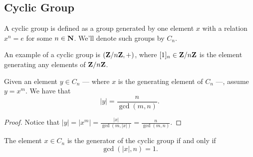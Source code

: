 \subsection{Cyclic Group}

\begin{definition}\label{def: cyclic-grp}
  A cyclic group is defined as a group generated by one element \(x\) with a
  relation \(x^n = e\) for some \(n \in \mathbf{N}\). We'll denote such groups by
  \(C_n\).
\end{definition}

\begin{example}
  An example of a cyclic group is \((\mathbf{Z}/n\mathbf{Z}, +)\), where \([1]_n \in \mathbf{Z}/n\mathbf{Z}\) is
  the element generating any elements of \(\mathbf{Z}/n\mathbf{Z}\).
\end{example}

\begin{proposition}
  Given an element \(y \in C_n\) --- where \(x\) is the generating element of
  \(C_n\) ---, assume \(y = x^m\). We have that
  \[
    |y| = \frac n {\operatorname{gcd}(m, n)}.
  \]
\end{proposition}

\begin{proof}
  Notice that \(|y| = |x^m| = \frac{|x|}{\operatorname{gcd}(m, |x|)} = \frac n
  {\operatorname{gcd}(m, n)}\).
\end{proof}

\begin{corollary}
  The element \(x \in C_n\) is the generator of the cyclic group if and only if
  \[
    \operatorname{gcd}(|x|, n) = 1.
  \]
\end{corollary}
